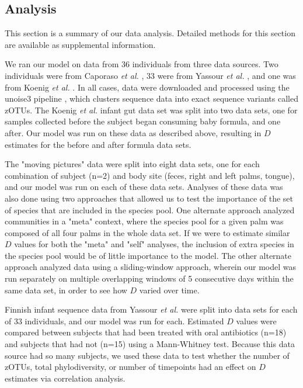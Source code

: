 \documentclass{article}
\begin{document}
\subsection{Analysis} \label{sec:analysis}
This section is a summary of our data analysis. Detailed methods for this section are available as supplemental information.
\par
We ran our model on data from 36 individuals from three data sources. Two individuals were from Caporaso \emph{et al.} \cite{Caporaso2011}, 33 were from Yassour \emph{et al.} \cite{Yassour2016}, and one was from Koenig \emph{et al.} \cite{Koenig2011}. In all cases, data were downloaded and processed using the unoise3 pipeline \cite{Edgar2016}, which clusters sequence data into exact sequence variants called zOTUs. The Koenig \emph{et al.} infant gut data set was split into two data sets, one for samples collected before the subject began consuming baby formula, and one after. Our model was run on these data as described above, resulting in \(D\) estimates for the before and after formula data sets. 
\par
The "moving pictures" \cite{Caporaso2011} data were split into eight data sets, one for each combination of subject (n=2) and body site (feces, right and left palms, tongue), and our model was run on each of these data sets. Analyses of these data was also done using two approaches that allowed us to test the importance of the set of species that are included in the species pool. One alternate approach analyzed communities in a "meta" context, where the species pool for a given palm was composed of all four palms in the whole data set. If we were to estimate similar \(D\) values for both the "meta" and "self" analyses, the inclusion of extra species in the species pool would be of little importance to the model. The other alternate approach analyzed data using a sliding-window approach, wherein our model was run separately on multiple overlapping windows of 5 consecutive days within the same data set, in order to see how \(D\) varied over time. 
\par
Finnish infant sequence data from Yassour \emph{et al.} \cite{Yassour2016} were split into data sets for each of 33 individuals, and our model was run for each. Estimated \(D\) values were compared between subjects that had been treated with oral antibiotics (n=18) and subjects that had not (n=15) using a Mann-Whitney test. Because this data source had so many subjects, we used these data to test whether the number of zOTUs, total phylodiversity, or number of timepoints had an effect on \(D\) estimates via correlation analysis. 
\end{document}
